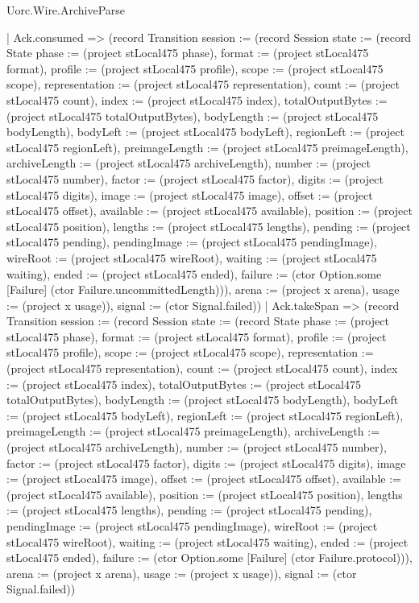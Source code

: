 \begin{lexlean}{Uorc.Wire.ArchiveParse}
\begin{semanticmodule}
{          | Ack.consumed => (record Transition {session := (record Session {state := (record State {phase := (project stLocal475 phase), format := (project stLocal475 format), profile := (project stLocal475 profile), scope := (project stLocal475 scope), representation := (project stLocal475 representation), count := (project stLocal475 count), index := (project stLocal475 index), totalOutputBytes := (project stLocal475 totalOutputBytes), bodyLength := (project stLocal475 bodyLength), bodyLeft := (project stLocal475 bodyLeft), regionLeft := (project stLocal475 regionLeft), preimageLength := (project stLocal475 preimageLength), archiveLength := (project stLocal475 archiveLength), number := (project stLocal475 number), factor := (project stLocal475 factor), digits := (project stLocal475 digits), image := (project stLocal475 image), offset := (project stLocal475 offset), available := (project stLocal475 available), position := (project stLocal475 position), lengths := (project stLocal475 lengths), pending := (project stLocal475 pending), pendingImage := (project stLocal475 pendingImage), wireRoot := (project stLocal475 wireRoot), waiting := (project stLocal475 waiting), ended := (project stLocal475 ended), failure := (ctor Option.some [Failure] (ctor Failure.uncommittedLength))}), arena := (project x arena), usage := (project x usage)}), signal := (ctor Signal.failed)})
          | Ack.takeSpan => (record Transition {session := (record Session {state := (record State {phase := (project stLocal475 phase), format := (project stLocal475 format), profile := (project stLocal475 profile), scope := (project stLocal475 scope), representation := (project stLocal475 representation), count := (project stLocal475 count), index := (project stLocal475 index), totalOutputBytes := (project stLocal475 totalOutputBytes), bodyLength := (project stLocal475 bodyLength), bodyLeft := (project stLocal475 bodyLeft), regionLeft := (project stLocal475 regionLeft), preimageLength := (project stLocal475 preimageLength), archiveLength := (project stLocal475 archiveLength), number := (project stLocal475 number), factor := (project stLocal475 factor), digits := (project stLocal475 digits), image := (project stLocal475 image), offset := (project stLocal475 offset), available := (project stLocal475 available), position := (project stLocal475 position), lengths := (project stLocal475 lengths), pending := (project stLocal475 pending), pendingImage := (project stLocal475 pendingImage), wireRoot := (project stLocal475 wireRoot), waiting := (project stLocal475 waiting), ended := (project stLocal475 ended), failure := (ctor Option.some [Failure] (ctor Failure.protocol))}), arena := (project x arena), usage := (project x usage)}), signal := (ctor Signal.failed)})
}
\end{semanticmodule}
\end{lexlean}
